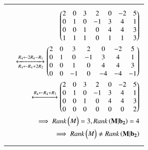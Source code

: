 \documentclass[journal,12pt]{IEEEtran}
\begin{document}
\begin{longtable}{|l|l|}
& \parbox{10cm}{\begin{align}
 \begin{pmatrix}2 & 0 & 3 & 2 & 0 & -2 & 5\\ 0 & 1 & 0 & -1 & 3 &4 & 1\\ 0 & 0 & 1 & 0& 4 & 4 & 3 \\ 1 & 1& 1& 0 & 1 & 1 & 3\end{pmatrix}\\ \xleftrightarrow[R_4\leftarrow R_4+2R_2] {R_4\leftarrow 2R_4-R_1} \begin{pmatrix}2 & 0 & 3 & 2 & 0 & -2 & 5\\ 0 & 1 & 0 & -1 & 3 &4 & 1\\ 0 & 0 & 1 & 0& 4 & 4 & 3 \\ 0 & 0& -1& 0 & -4 & -4 & -1\end{pmatrix}\\
 \xleftrightarrow{R_4\leftarrow R_4 + R_3} \begin{pmatrix}2 & 0 & 3 & 2 & 0 & -2 & 5\\ 0 & 1 & 0 & -1 & 3 &4 & 1\\ 0 & 0 & 1 & 0& 4 & 4 & 3 \\ 0 & 0& 0& 0 & 0 & 0 & 2\end{pmatrix}\\
 \implies Rank\begin{pmatrix}M\end{pmatrix}= 3, Rank\left(\mathbf{M|}\mathbf{b_{2}}\right)= 4\\
  \implies Rank\begin{pmatrix}M\end{pmatrix} \ne Rank\left(\mathbf{M|}\mathbf{b_{2}}\right)\label{B}
\end{align}}\\
\hline
& \\
& \parbox{10cm}{\begin{align}
 \myvec{2 & 0 & 3 & 2 & 0 & -2 & 0\\ 0 & 1 & 0 & -1 & 3 & 4 & 0\\ 0 & 0 & 1 & 0& 4 & 4 & -2 \\ 1 & 1& 1& 0 & 1 & 1 & 1}\\ \xleftrightarrow[R_4\leftarrow R_4-2R_2] {R_4\leftarrow 2R_4-R_1} \myvec{2 & 0 & 3 & 2 & 0 & -2 & 0\\ 0 & 1 & 0 & -1 & 3 &4 & 0\\ 0 & 0 & 1 & 0& 4 & 4 & -2\\ 0 & 0& -1 & 0 & -4 & -4 & 2}\\
 \xleftrightarrow{R_4\leftarrow R_4 + R_3} \myvec{2 & 0 & 3 & 2 & 0 & -2 & 0\\ 0 & 1 & 0 & -1 & 3 &4 & 0\\ 0 & 0 & 1 & 0& 4 & 4 & -2\\ 0 & 0& 0& 0 & 0 & 0 & 0}\\
 \implies Rank\myvec{M}= 3, Rank\brak{\vec{M|}\brak{\vec{b_{1}-b_{2}}}}= 3\\

\end{align}}
\end{longtable}
\end{document}
